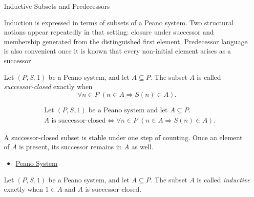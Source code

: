 \begin{topicbox}{Inductive Subsets and Predecessors}
\begin{exposition}
Induction is expressed in terms of subsets of a Peano system. Two structural
notions appear repeatedly in that setting: closure under successor and
membership generated from the distinguished first element. Predecessor language
is also convenient once it is known that every non-initial element arises as a
successor.
\end{exposition}

\begin{tcolorbox}[colback=defbox, colframe=defborder, arc=2pt,
  left=6pt, right=6pt, top=4pt, bottom=4pt,
  title={\small\textbf{Definition (Successor-Closed Subset)}} ,
  fonttitle=\small\bfseries]
\begin{definition}
\label{def:successor-closed-subset}
Let $(P,S,1)$ be a Peano system, and let $A \subseteq P$. The subset $A$ is
called \emph{successor-closed} exactly when
\[
\forall n \in P\;(n \in A \Longrightarrow S(n) \in A).
\]
\end{definition}
\end{tcolorbox}

\begin{remark*}
\[
\begin{aligned}
&\text{Let } (P,S,1) \text{ be a Peano system and let } A \subseteq P.\\
&A \text{ is successor-closed}
\Longleftrightarrow
\forall n \in P\;(n \in A \Longrightarrow S(n) \in A).
\end{aligned}
\]
\end{remark*}

\begin{remark*}[Interpretation]
A successor-closed subset is stable under one step of counting. Once an
element of $A$ is present, its successor remains in $A$ as well.
\end{remark*}

\begin{remark*}[Dependencies]
\begin{itemize}
  \item \hyperref[def:peano-system]{Peano System}
\end{itemize}
\end{remark*}

\begin{tcolorbox}[colback=defbox, colframe=defborder, arc=2pt,
  left=6pt, right=6pt, top=4pt, bottom=4pt,
  title={\small\textbf{Definition (Inductive Subset of a Peano System)}} ,
  fonttitle=\small\bfseries]
\begin{definition}
\label{def:inductive-subset-of-peano-system}
Let $(P,S,1)$ be a Peano system, and let $A \subseteq P$. The subset $A$ is
called \emph{inductive} exactly when $1 \in A$ and $A$ is successor-closed.
\end{definition}
\end{tcolorbox}


\end{topicbox}
